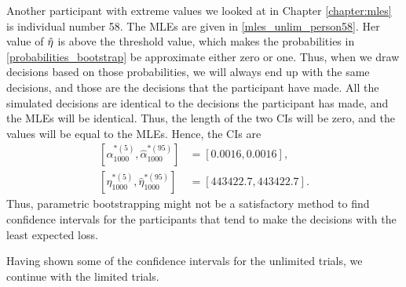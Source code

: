 Another participant with extreme values we looked at in Chapter \ref{chapter:mles} is individual number 58. The MLEs are given in \eqref{mles_unlim_person58}. Her value of $\hat{\eta}$ is above the threshold value, which makes the probabilities in \eqref{probabilities_bootstrap} be approximate either zero or one. Thus, when we draw decisions based on those probabilities, we will always end up with the same decisions, and those are the decisions that the participant have made. All the simulated decisions are identical to the decisions the participant has made, and the MLEs will be identical. Thus, the length of the two CIs will be zero, and the values will be equal to the MLEs. Hence, the CIs are
\begin{equation*}
    \begin{aligned}
         \left[ \hat{\alpha}^{*(5)}_{1000},\hat{\alpha}^{*(95)}_{1000}\right] &= [0.0016,0.0016],\\
         \left[\hat{\eta}^{*(5)}_{1000},\hat{\eta}^{*(95)}_{1000}\right] &= [443422.7,443422.7].
    \end{aligned}
\end{equation*}
Thus, parametric bootstrapping might not be a satisfactory method to find confidence intervals for the participants that tend to make the  decisions with the least expected loss. 

Having shown some of the confidence intervals for the unlimited trials, we continue with the limited trials.












